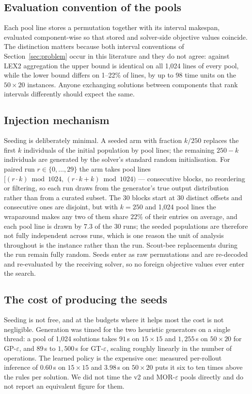\documentclass[review]{elsarticle}
\begin{document}
\subsection{Evaluation convention of the pools}\label{sec:audit}
Each pool line stores a permutation together with its interval makespan,
evaluated component-wise so that stored and solver-side objective values
coincide. The distinction matters because both interval conventions of
Section~\ref{sec:problem} occur in this literature and they do not agree:
against LEX2 aggregation the upper bound is identical on all
1{,}024 lines of every pool, while the lower bound differs on 1--22\% of
lines, by up to 98 time units on the $50\times20$ instances. Anyone
exchanging solutions between components that rank intervals differently
should expect the same.

\subsection{Injection mechanism}
Seeding is deliberately minimal. A seeded arm with fraction $k/250$
replaces the first $k$ individuals of the initial population by pool lines;
the remaining $250-k$ individuals are generated by the solver's standard
random initialisation. For paired run $r\in\{0,\dots,29\}$ the arm takes
pool lines $[(r\cdot k)\bmod 1024,\,(r\cdot k+k)\bmod 1024)$ --- consecutive
blocks, no reordering or filtering, so each run draws from the generator's
true output distribution rather than from a curated subset. The 30 blocks
start at 30 distinct offsets and consecutive ones are disjoint, but with
$k=250$ and 1{,}024 pool lines the wraparound makes any two of them share
$22\%$ of their entries on average, and each pool line is drawn by $7.3$
of the 30 runs; the seeded populations are therefore not fully independent
across runs, which is one reason the unit of analysis throughout is the
instance rather than the run. Scout-bee replacements
during the run remain fully random. Seeds enter as raw permutations and are
re-decoded and re-evaluated by the receiving solver, so no foreign
objective values ever enter the search.

\subsection{The cost of producing the seeds}\label{sec:gencost}

Seeding is not free, and at the budgets where it helps most the cost is not
negligible. Generation was timed for the two heuristic generators on a
single thread: a pool of 1{,}024 solutions takes $91$\,s on $15\times15$
and $1{,}255$\,s on $50\times20$ for GP-$\varepsilon$, and $89$\,s to
$1{,}500$\,s for GT-$\varepsilon$, scaling roughly linearly in the number of
operations. The learned policy is the expensive one: measured per-rollout
inference of $0.60$\,s on $15\times15$ and $3.98$\,s on $50\times20$ puts it
six to ten times above the rules per solution. We did not time the v2 and
MOR-$\varepsilon$ pools directly and do not report an equivalent figure for
them.
\end{document}

